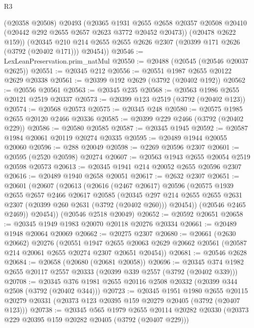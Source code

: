 \begin{lexlean}{R3}
\begin{coremodule}
        (@20358 @20508)
        @20493
        (@20365
          @1931
          @2655
          @2658
          @20357
          @20508
          @20410
          (@20442 @292 @2655 @2657 @2623 @3772 @20452 @20473))
        (@20478 @2622 @159))
      (@20345 @210 @214 @2655 @2655 @2626 @2307 (@20399 @171 @2626 (@3792 (@20402 @171))) @20454))
@20546 := LexLeanPreservation.prim_natMul
@20550 := @20488 (@20545 (@20546 @20037 @2625))
@20551 := @20345 @212
@20556 := @20551 @1987 @2655 @20122 @2629 @20338
@20561 := @20399 @192 @2629 (@3792 (@20402 @192))
@20562 := @20556 @20561
@20563 := @20345 @235
@20568 := @20563 @1986 @2655 @20121 @2519 @20337
@20573 := @20399 @123 @2519 (@3792 (@20402 @123))
@20574 := @20568 @20573
@20575 := @20345 @248
@20580 := @20575 @1985 @2655 @20120 @2466 @20336
@20585 := @20399 @229 @2466 (@3792 (@20402 @229))
@20586 := @20580 @20585
@20587 := @20345 @1945
@20592 := @20587 @1984 @20061 @20119 @20274 @20335
@20595 := @20489 @1944 @20055 @20060
@20596 := @288 @20049
@20598 := @2269 @20596 @2307
@20601 := @20595 (@2520 @20598) @20274
@20607 := @20563 @1943 @2655 @20054 @2519 @20598 @20573
@20613 := @20345 @1941 @214 @20052 @2655 @20596 @2307
@20616 := @20489 @1940 @2658 @20051
@20617 := @2632 @2307
@20651 := @20601
    (@20607
      (@20613
        (@20616
          (@2467 @20617)
          @20596
          (@20575
            @1939
            @2655
            @2657
            @2466
            @20617
            @20585
            (@20345
              @297
              @214
              @2655
              @2655
              @2631
              @2307
              (@20399 @260 @2631 (@3792 (@20402 @260)))
              @20454))
          (@20546 @2465 @2469))
        @20454))
    (@20546 @2518 @20049)
@20652 := @20592 @20651
@20658 := @20345 @1949 @1983 @20070 @20118 @20276 @20334
@20661 := @20489 @1948 @20064 @20069
@20662 := @20275 @2307
@20680 := @20661
    (@2630 @20662)
    @20276
    (@20551
      @1947
      @2655
      @20063
      @2629
      @20662
      @20561
      (@20587 @214 @20061 @2655 @20274 @2307 @20651 @20454))
@20681 := @20546 @2628
@20684 := @20658 (@20680 (@20681 @20058))
@20696 := @20345 @374 @1982 @2655 @20117 @2557 @20333 (@20399 @339 @2557 (@3792 (@20402 @339)))
@20708 := @20345 @376 @1981 @2655 @20116 @2508 @20332 (@20399 @344 @2508 (@3792 (@20402 @344)))
@20723 := @20345
    @1951
    @1980
    @2655
    @20115
    @20279
    @20331
    (@20373 @123 @20395 @159 @20279 @20405 (@3792 (@20407 @123)))
@20738 := @20345
    @565
    @1979
    @2655
    @20114
    @20282
    @20330
    (@20373 @229 @20395 @159 @20282 @20405 (@3792 (@20407 @229)))

\end{coremodule}
\end{lexlean}
